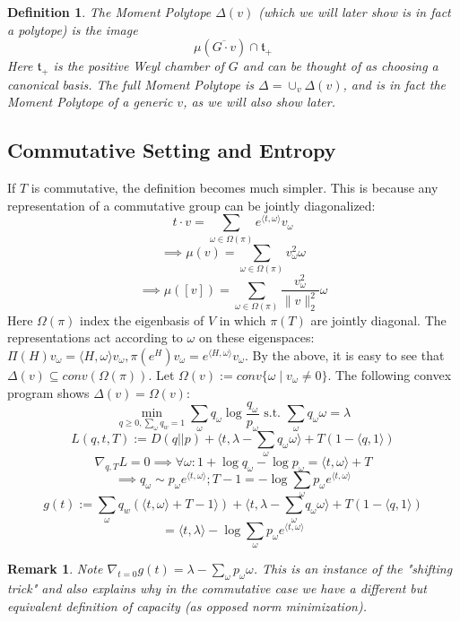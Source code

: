 \documentclass{article}
\newtheorem{remark}{Remark}
\newtheorem{definition}{Definition}
\begin{document}
\begin{definition}
The Moment Polytope $\Delta(v)$ (which we will later show is in fact a polytope) is the image
\[ \mu(\overline{G \cdot v}) \cap \mathfrak{t}_{+}   \]
Here $\mathfrak{t}_{+}$ is the positive Weyl chamber of $G$ and can be thought of as choosing a canonical basis. The full Moment Polytope is $\Delta = \cup_{v} \Delta(v)$, and is in fact the Moment Polytope of a generic $v$, as we will also show later. 
\end{definition}

\subsection{Commutative Setting and Entropy}
If $T$ is commutative, the definition becomes much simpler. This is because any representation of a commutative group can be jointly diagonalized:
\[ t \cdot v = \sum_{\omega \in \Omega(\pi)} e^{\langle t, \omega \rangle} v_{\omega}   \]
\[ \implies \mu(v) = \sum_{\omega \in \Omega(\pi)} v_{\omega}^{2} \omega    \]
\[ \implies \mu([v]) = \sum_{\omega \in \Omega(\pi)} \frac{v_{\omega}^{2}}{\|v\|_{2}^{2}} \omega  \]
Here $\Omega(\pi)$ index the eigenbasis of $V$ in which $\pi(T)$ are jointly diagonal. The representations act according to $\omega$ on these eigenspaces: $\Pi(H)v_{\omega} = \langle H, \omega \rangle v_{\omega}, \pi(e^{H})v_{\omega} = e^{\langle H, \omega \rangle} v_{\omega}$. 
By the above, it is easy to see that $\Delta(v) \subseteq conv(\Omega(\pi))$. Let $\Omega(v) := conv\{\omega \mid v_{\omega} \neq 0\}$. The following convex program shows $\Delta(v) = \Omega(v)$:
\[ \min_{q \geq 0, \sum_{\omega} q_{w} = 1} \sum_{\omega} q_{\omega} \log \frac{q_{\omega}}{p_{\omega}} \text{ s.t. } \sum_{\omega} q_{\omega} \omega = \lambda  \]
\[ L(q,t,T) := D(q||p) + \langle t, \lambda - \sum_{\omega} q_{\omega} \omega \rangle + T (1 - \langle q, 1 \rangle)    \]
\[ \nabla_{q,T} L = 0 \implies \forall \omega: 1 + \log q_{\omega} - \log p_{\omega} = \langle t, \omega \rangle + T  \]
\[ \implies q_{\omega} \sim p_{\omega} e^{\langle t, \omega \rangle}; T - 1 = -\log \sum_{\omega} p_{\omega} e^{\langle t, \omega \rangle}  \]
\[ g(t) := \sum_{\omega} q_{w} (\langle t, \omega \rangle + T - 1 \rangle) + \langle t, \lambda - \sum_{\omega} q_{\omega} \omega \rangle + T(1 - \langle q, 1 \rangle)  \]
\[ = \langle t, \lambda \rangle - \log \sum_{\omega} p_{\omega} e^{\langle t, \omega \rangle}    \]
\begin{remark}
Note $\nabla_{t=0} g(t) = \lambda - \sum_{\omega} p_{\omega} \omega$. This is an instance of the "shifting trick" and also explains why in the commutative case we have a different but equivalent definition of capacity (as opposed norm minimization). 
\end{remark}
\end{document}
